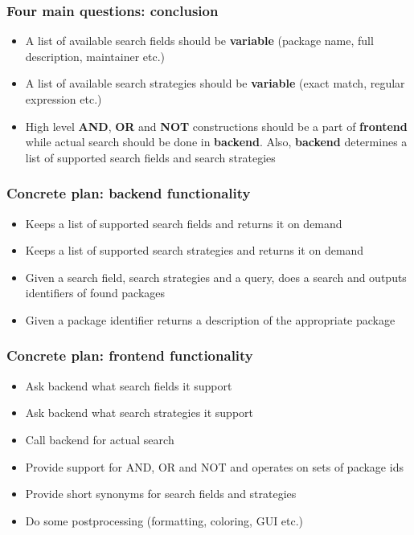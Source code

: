 \documentclass[hyperref=unicode,ascii,xcolor=dvipsnames]{beamer}
\begin{document}

\begin{frame}[fragile]
  \frametitle{Four main questions: conclusion}
  \begin{itemize}
  \item A list of available search fields should be {\bf variable} (package
    name, full description, maintainer etc.)
  \item A list of available search strategies should be {\bf variable}
    (exact match, regular expression etc.)
  \item High level {\bf AND}, {\bf OR} and {\bf NOT} constructions
    should be a part of {\bf frontend} while actual search should be
    done in {\bf backend}. Also, {\bf backend} determines a list of
    supported search fields and search strategies
  \end{itemize}
\end{frame}


\begin{frame}[fragile]
  \frametitle{Concrete plan: backend functionality}
  \begin{itemize}
  \item Keeps a list of supported search fields and returns it on demand
  \item Keeps a list of supported search strategies and returns it on demand
  \item Given a search field, search strategies and a query, does a
    search and outputs identifiers of found packages
  \item Given a package identifier returns a description of the appropriate package
  \end{itemize}
\end{frame}


\begin{frame}[fragile]
  \frametitle{Concrete plan: frontend functionality}
  \begin{itemize}
  \item Ask backend what search fields it support
  \item Ask backend what search strategies it support
  \item Call backend for actual search
  \item Provide support for AND, OR and NOT and operates on sets of package ids
  \item Provide short synonyms for search fields and strategies
  \item Do some postprocessing (formatting, coloring, GUI etc.)
  \end{itemize}
\end{frame}
\end{document}
